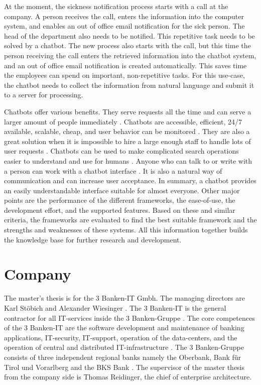 At the moment, the sickness notification process starts with a call at the company. 
A person receives the call, enters the information into the computer system, and enables an out of office email notification for the sick person. 
The head of the department also needs to be notified. 
This repetitive task needs to be solved by a chatbot. 
The new process also starts with the call, but this time the person receiving the call enters the retrieved information into the chatbot system, and an out of office email notification is created automatically. 
This saves time the employees can spend on important, non-repetitive tasks.
For this use-case, the chatbot needs to collect the information from natural language and submit it to a server for processing.

Chatbots offer various benefits.
They serve requests all the time and can serve a larger amount of people immediately \cite{kane2016role}.
Chatbots are accessible, efficient, 24/7 available, scalable, cheap, and user behavior can be monitored \cite{buiildChatbotsPython}.
They are also a great solution when it is impossible to hire a large enough staff to handle lots of user requests \cite{kane2016role}.
Chatbots can be used to make complicated search operations easier to understand and use for humans \cite{kane2016role}.
Anyone who can talk to or write with a person can work with a chatbot interface \cite{buiildChatbotsPython}.
It is also a natural way of communication and can increase user acceptance.
In summary, a chatbot provides an easily understandable interface suitable for almost everyone.
Other major points are the performance of the different frameworks, the ease-of-use, the development effort, and the supported features.
Based on these and similar criteria, the frameworks are evaluated to find the best suitable framework and the strengths and weaknesses of these systems.
All this information together builds the knowledge base for further research and development.

\section{Company}
The master's thesis is for the 3 Banken-IT Gmbh. The managing directors are Karl St\"obich and Alexander Wiesinger \cite{3bitorgani}. 
The 3 Banken-IT is the general contractor for all IT-services inside the 3 Banken-Gruppe \cite{3bitservices}. 
The core competences of the 3 Banken-IT are the software development and maintenance of banking applications, IT-security, 
IT-support, operation of the data-centers, and the operation of central and distributed IT-infrastructure \cite{3bitservices}. 
The 3 Banken-Gruppe consists of three independent regional banks namely the Oberbank, Bank für Tirol und Vorarlberg and the BKS Bank \cite{3bitcompany}. 
The supervisor of the master thesis from the company side is Thomas Reidinger, the chief of enterprise architecture.

